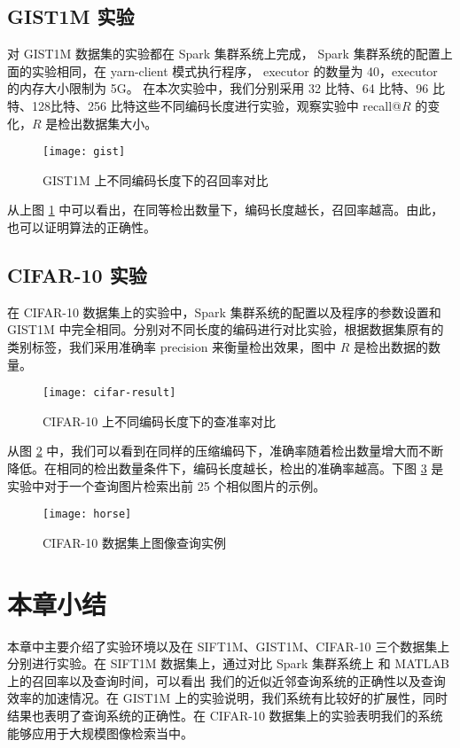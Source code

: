 \subsection{GIST1M 实验}
对 GIST1M 数据集的实验都在 Spark 集群系统上完成， Spark 集群系统的配置上面的实验相同，在 yarn-client 模式执行程序， executor 的数量为 40，executor 的内存大小限制为 5G。 在本次实验中，我们分别采用 32 比特、64 比特、96 比特、128比特、256 比特这些不同编码长度进行实验，观察实验中 recall@$R$ 的变化，$R$ 是检出数据集大小。
\begin{figure}[H]
  \centering
  \texttt{[image: gist]}
  \caption{GIST1M 上不同编码长度下的召回率对比}
  \label{fig:gist}
\end{figure}
从上图 \ref{fig:gist} 中可以看出，在同等检出数量下，编码长度越长，召回率越高。由此，也可以证明算法的正确性。
\subsection{CIFAR-10 实验}
在 CIFAR-10 数据集上的实验中，Spark 集群系统的配置以及程序的参数设置和 GIST1M 中完全相同。分别对不同长度的编码进行对比实验，根据数据集原有的类别标签，我们采用准确率 precision 来衡量检出效果，图中 $R$ 是检出数据的数量。
\begin{figure}[H]
  \centering
  \texttt{[image: cifar-result]}
  \caption{CIFAR-10 上不同编码长度下的查准率对比}
  \label{fig:cifar-result}
\end{figure}
从图 \ref{fig:cifar-result} 中，我们可以看到在同样的压缩编码下，准确率随着检出数量增大而不断降低。在相同的检出数量条件下，编码长度越长，检出的准确率越高。下图 \ref{fig:horse} 是实验中对于一个查询图片检索出前 25 个相似图片的示例。
\begin{figure}[H]
  \centering
  \texttt{[image: horse]}
  \caption{CIFAR-10 数据集上图像查询实例}
  \label{fig:horse}
\end{figure}
\section{本章小结}
本章中主要介绍了实验环境以及在 SIFT1M、GIST1M、CIFAR-10 三个数据集上分别进行实验。在 SIFT1M 数据集上，通过对比 Spark 集群系统上 和 MATLAB 上的召回率以及查询时间，可以看出 我们的近似近邻查询系统的正确性以及查询效率的加速情况。在 GIST1M 上的实验说明，我们系统有比较好的扩展性，同时结果也表明了查询系统的正确性。在 CIFAR-10 数据集上的实验表明我们的系统能够应用于大规模图像检索当中。
